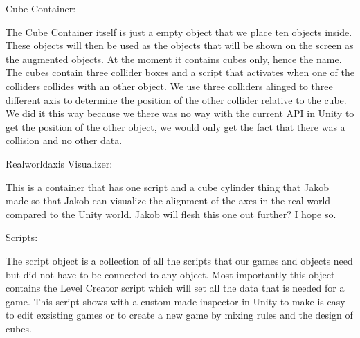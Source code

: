 Cube Container:

The Cube Container itself is just a empty object that we place ten objects inside. These objects will then be used as the objects that will be shown on the screen as the augmented objects. At the moment it contains cubes only, hence the name.
The cubes contain three collider boxes and a script that activates when one of the colliders collides with an other object. We use three colliders alinged to three different axis to determine the position of the other collider relative to the cube. We did it this way because we there was no way with the current API in Unity to get the position of the other object, we would only get the fact that there was a collision and no other data.

Realworldaxis Visualizer:

This is a container that has one script and a cube cylinder thing that Jakob made so that Jakob can visualize the alignment of the axes in the real world compared to the Unity world.
Jakob will flesh this one out further? I hope so.


Scripts:

The script object is a collection of all the scripts that our games and objects need but did not have to be connected to any object. Most importantly this object contains the Level Creator script which will set all the data that is needed for a game. This script shows with a custom made inspector in Unity to make is easy to edit exsisting games or to create a new game by mixing rules and the design of cubes.

